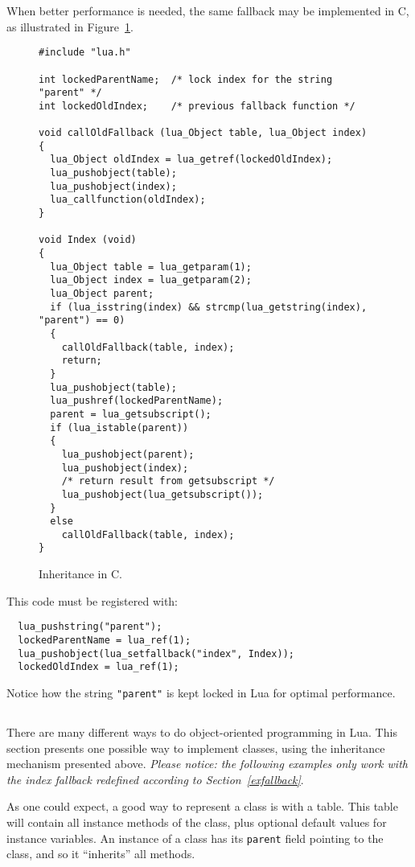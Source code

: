 When better performance is needed,
the same fallback may be implemented in C,
as illustrated in Figure~\ref{Cinher}.
\begin{figure}
\Line
\begin{verbatim}
#include "lua.h"

int lockedParentName;  /* lock index for the string "parent" */
int lockedOldIndex;    /* previous fallback function */

void callOldFallback (lua_Object table, lua_Object index)
{
  lua_Object oldIndex = lua_getref(lockedOldIndex);
  lua_pushobject(table);
  lua_pushobject(index);
  lua_callfunction(oldIndex);
}

void Index (void)
{
  lua_Object table = lua_getparam(1);
  lua_Object index = lua_getparam(2);
  lua_Object parent;
  if (lua_isstring(index) && strcmp(lua_getstring(index), "parent") == 0)
  {
    callOldFallback(table, index);
    return;
  }
  lua_pushobject(table);
  lua_pushref(lockedParentName);
  parent = lua_getsubscript();
  if (lua_istable(parent))
  {
    lua_pushobject(parent);
    lua_pushobject(index);
    /* return result from getsubscript */
    lua_pushobject(lua_getsubscript());
  }
  else
    callOldFallback(table, index);
}
\end{verbatim}
\caption{Inheritance in C.\label{Cinher}}
\Line
\end{figure}
This code must be registered with:
\begin{verbatim}
  lua_pushstring("parent");
  lockedParentName = lua_ref(1);
  lua_pushobject(lua_setfallback("index", Index));
  lockedOldIndex = lua_ref(1);
\end{verbatim}
Notice how the string \verb'"parent"' is kept
locked in Lua for optimal performance.

\subsection{}
There are many different ways to do object-oriented programming in Lua.
This section presents one possible way to
implement classes,
using the inheritance mechanism presented above.
{\em Please notice: the following examples only work
with the index fallback redefined according to
Section~\ref{exfallback}}.

As one could expect, a good way to represent a class is
with a table.
This table will contain all instance methods of the class,
plus optional default values for instance variables.
An instance of a class has its \verb'parent' field pointing to
the class,
and so it ``inherits'' all methods.

